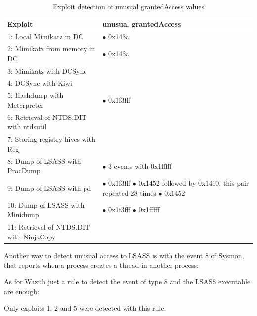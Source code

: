\begin{table}[H]
	\begin{tabularx}{\textwidth}{|l|X|}
		\hline
		\rowcolor{gray!30}
		Exploit & unusual grantedAccess\\ \hline
		1: Local Mimikatz in DC& \cellcolor{green!60}$\bullet$ 0x143a\\ \hline
		2: Mimikatz from memory in DC& \cellcolor{green!60} $\bullet$ 0x143a\\ \hline
		3: Mimikatz with DCSync& \cellcolor{red!60}\\ \hline
		4: DCSync with Kiwi& \cellcolor{red!60}\\ \hline
		5: Hashdump with Meterpreter& \cellcolor{green!60}$\bullet$ 0x1f3fff\\ \hline
		6: Retrieval of NTDS.DIT with ntdsutil& \cellcolor{red!60}\\ \hline
		7: Storing registry hives with Reg& \cellcolor{red!60}\\ \hline
		8: Dump of LSASS with ProcDump& \cellcolor{green!60}$\bullet$ 3 events with 0x1fffff\\ \hline
		9: Dump of LSASS with pd& \cellcolor{green!60}
			$\bullet$ 0x1f3fff \linej
			$\bullet$ 0x1452 followed by 0x1410, this pair repeated 28 times \linej
			$\bullet$ 0x1452 \\ \hline
		10: Dump of LSASS with Minidump& \cellcolor{green!60}
			$\bullet$ 0x1f3fff \linej
			$\bullet$ 0x1fffff \\ \hline
		11: Retrieval of NTDS.DIT with NinjaCopy& \cellcolor{red!60}\\ \hline
	\end{tabularx}
	\caption{Exploit detection of unusual grantedAccess values}
\end{table}
\linej
Another way to detect unusual access to LSASS is with the event 8 of Sysmon\cite{detection_events}, that reports when a process creates a thread in another process:

\linej
As for Wazuh just a rule to detect the event of type 8 and the LSASS executable are enough:

\linej
Only exploits 1, 2 and 5 were detected with this rule.

